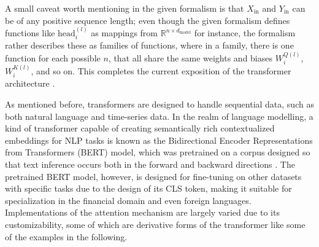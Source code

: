 \documentclass[stu,floatsintext]{apa7}
\begin{document}
A small caveat worth mentioning in the given formalism is that $X_{\text{in}}$ and $Y_{\text{in}}$ can be of any positive sequence length; even though the given formalism defines functions like $\text{head}_i^{(l)}$ as mappings from $\mathbb R^{n\times d_{\text{model}}}$ for instance, the formalism rather describes these as families of functions, where in a family, there is one function for each possible $n$, that all share the same weights and biases $W_i^{Q(l)}$, $W_i^{K(l)}$, and so on. This completes the current exposition of the transformer architecture \parencite{vaswani2017attention}.

As mentioned before, transformers are designed to handle sequential data, such as both natural language and time-series data. In the realm of language modelling, a kind of transformer capable of creating semantically rich contextualized embeddings for NLP tasks is known as the Bidirectional Encoder Representations from Transformers (BERT) model, which was pretrained on a corpus designed so that text inference occurs both in the forward and backward directions \parencite{devlin2019bert}. The pretrained BERT model, however, is designed for fine-tuning on other datasets with specific tasks due to the design of its CLS token, making it suitable for specialization in the financial domain and even foreign languages. Implementations of the attention mechanism are largely varied due to its customizability, some of which are derivative forms of the transformer like some of the examples in the following.
\end{document}

